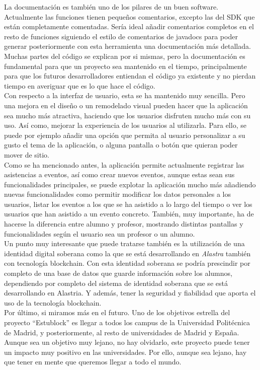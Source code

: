 La documentación es también uno de los pilares de un buen software. Actualmente las funciones tienen pequeños comentarios, excepto las del SDK que están completamente comentadas. Sería ideal añadir comentarios completos en el resto de funciones siguiendo el estilo de comentarios de javadocs para poder generar posteriormente con esta herramienta una documentación más detallada. Muchas partes del código se explican por si mismas, pero la documentación es fundamental para que un proyecto sea mantenido en el tiempo, principalmente para que los futuros desarrolladores entiendan el código ya existente y no pierdan tiempo en averiguar que es lo que hace el código. \\

Con respecto a la interfaz de usuario, esta se ha mantenido muy sencilla. Pero una mejora en el diseño o un remodelado visual pueden hacer que la aplicación sea mucho más atractiva, haciendo que los usuarios disfruten mucho más con su uso. Así como, mejorar la experiencia de los usuarios al utilizarla. Para ello, se puede por ejemplo añadir una opción que permita al usuario personalizar a su gusto el tema de la aplicación, o alguna pantalla o botón que quieran poder mover de sitio. \\

Como se ha mencionado antes, la aplicación permite actualmente registrar las asistencias a eventos, así como crear nuevos eventos, aunque estas sean sus funcionalidades principales, se puede explotar la aplicación mucho más añadiendo nuevas funcionalidades como permitir modificar los datos personales a los usuarios, listar los eventos a los que se ha asistido a lo largo del tiempo o ver los usuarios que han asistido a un evento concreto. También, muy importante, ha de hacerse la diferencia entre alumno y profesor, mostrando distintas pantallas y funcionalidades según el usuario sea un profesor o un alumno. \\

Un punto muy interesante que puede tratarse también es la utilización de una identidad digital soberana como la que se está desarrollando en \emph{Alastra}\cite{alastria} también con tecnología blockchain. Con esta identidad soberana se podría prescindir por completo de una base de datos que guarde información sobre los alumnos, dependiendo por completo del sistema de identidad soberana que se está desarrollando en Alastria. Y además, tener la seguridad y fiabilidad que aporta el uso de la tecnología blockchain. \\

Por último, si miramos más en el futuro. Uno de los objetivos estrella del proyecto ``Estublock'' es llegar a todos los campus de la Universidad Politécnica de Madrid, y posteriormente, al resto de universidades de Madrid y España. Aunque sea un objetivo muy lejano, no hay olvidarlo, este proyecto puede tener un impacto muy positivo en las universidades. Por ello, aunque sea lejano, hay que tener en mente que queremos llegar a todo el mundo. 
